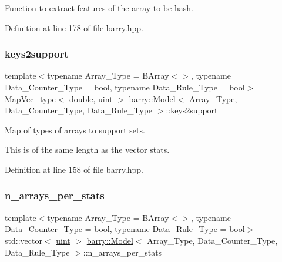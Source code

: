 Function to extract features of the array to be hash. 



Definition at line 178 of file barry.\+hpp.

\mbox{\label{classbarry_1_1_model_a802069270d02f2e2ad7e5f2adb51c2bc}} 
\subsubsection{\texorpdfstring{keys2support}{keys2support}}
{\footnotesize\ttfamily template$<$typename Array\+\_\+\+Type  = B\+Array$<$$>$, typename Data\+\_\+\+Counter\+\_\+\+Type  = bool, typename Data\+\_\+\+Rule\+\_\+\+Type  = bool$>$ \\
\hyperlink{namespacebarry_a2f0d3aab1d67e4c8eaeab9022e16139f}{Map\+Vec\+\_\+type}$<$ double, \hyperlink{namespacebarry_a11dfc53ddb4672278319aa04f1e09a6c}{uint} $>$ \hyperlink{classbarry_1_1_model}{barry\+::\+Model}$<$ Array\+\_\+\+Type, Data\+\_\+\+Counter\+\_\+\+Type, Data\+\_\+\+Rule\+\_\+\+Type $>$\+::keys2support}



Map of types of arrays to support sets. 

This is of the same length as the vector {\ttfamily stats}. 

Definition at line 158 of file barry.\+hpp.

\mbox{\label{classbarry_1_1_model_a6e72cbb235cf592668c286931a488830}} 
\subsubsection{\texorpdfstring{n\+\_\+arrays\+\_\+per\+\_\+stats}{n\_arrays\_per\_stats}}
{\footnotesize\ttfamily template$<$typename Array\+\_\+\+Type  = B\+Array$<$$>$, typename Data\+\_\+\+Counter\+\_\+\+Type  = bool, typename Data\+\_\+\+Rule\+\_\+\+Type  = bool$>$ \\
std\+::vector$<$ \hyperlink{namespacebarry_a11dfc53ddb4672278319aa04f1e09a6c}{uint} $>$ \hyperlink{classbarry_1_1_model}{barry\+::\+Model}$<$ Array\+\_\+\+Type, Data\+\_\+\+Counter\+\_\+\+Type, Data\+\_\+\+Rule\+\_\+\+Type $>$\+::n\+\_\+arrays\+\_\+per\+\_\+stats}



